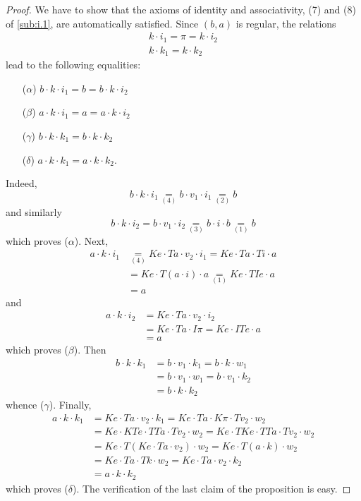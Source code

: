 \documentclass[fleqn]{article}
\newcommand{\oldpage}[1]{\marginpar{\footnotesize$\Big\vert$ \textit{p.~#1}}}
\begin{document}
\begin{proof}
  We have to show that the axioms of identity and associativity, (7) and (8) of \cref{sub:i.1}, are automatically satisfied.
  Since $(b,a)$ is regular, the relations
  \[
    \begin{gathered}
      k\cdot i_1
      = \pi
      = k\cdot i_2
    \\k\cdot k_1
      = k\cdot k_2
    \end{gathered}
  \]
  lead to the following equalities:
  \begin{enumerate}
    \item[($\alpha$)] $b\cdot k\cdot i_1=b=b\cdot k\cdot i_2$
    \item[($\beta$)] $a\cdot k\cdot i_1=a=a\cdot k\cdot i_2$
    \item[($\gamma$)] $b\cdot k\cdot k_1=b\cdot k\cdot k_2$
    \item[($\delta$)] $a\cdot k\cdot k_1=a\cdot k\cdot k_2$.
  \end{enumerate}
  Indeed,
  \oldpage{230}
  \[
    b\cdot k\cdot i_1
    \underset{(4)}{=} b\cdot v_1\cdot i_1
    \underset{(2)}{=} b
  \]
  and similarly
  \[
    b\cdot k\cdot i_2
    = b\cdot v_1\cdot i_2
    \underset{(3)}{=} b\cdot i\cdot b
    \underset{(1)}{=} b
  \]
  which proves ($\alpha$).
  Next,
  \[
    \begin{aligned}
      a\cdot k\cdot i_1
      &\underset{(4)}{=} Ke\cdot Ta\cdot v_2\cdot i_1
      = Ke\cdot Ta\cdot Ti\cdot a
    \\&= Ke\cdot T(a\cdot i)\cdot a
      \underset{(1)}{=} Ke\cdot TIe\cdot a
    \\&= a
    \end{aligned}
  \]
  and
  \[
    \begin{aligned}
      a\cdot k\cdot i_2
      &= Ke\cdot Ta\cdot v_2\cdot i_2
    \\&= Ke\cdot Ta\cdot I\pi
      =Ke\cdot ITe\cdot a
    \\&= a
    \end{aligned}
  \]
  which proves ($\beta$).
  Then
  \[
    \begin{aligned}
      b\cdot k\cdot k_1
      &= b\cdot v_1\cdot k_1
      = b\cdot k\cdot w_1
    \\&= b\cdot v_1\cdot w_1
      = b\cdot v_1\cdot k_2
    \\&= b\cdot k\cdot k_2
    \end{aligned}
  \]
  whence ($\gamma$).
  Finally,
  \[
    \begin{aligned}
      a\cdot k\cdot k_1
      &= Ke\cdot Ta\cdot v_2\cdot k_1
      = Ke\cdot Ta\cdot K\pi\cdot Tv_2\cdot w_2
    \\&= Ke\cdot KTe\cdot TTa\cdot Tv_2\cdot w_2
      = Ke\cdot TKe\cdot TTa\cdot Tv_2\cdot w_2
    \\&= Ke\cdot T(Ke\cdot Ta\cdot v_2)\cdot w_2
      = Ke\cdot T(a\cdot k)\cdot w_2
    \\&= Ke\cdot Ta\cdot Tk\cdot w_2
      = Ke\cdot Ta\cdot v_2\cdot k_2
    \\&= a\cdot k\cdot k_2
    \end{aligned}
  \]
  which proves ($\delta$).
  The verification of the last claim of the proposition is easy.
\end{proof}
\end{document}
